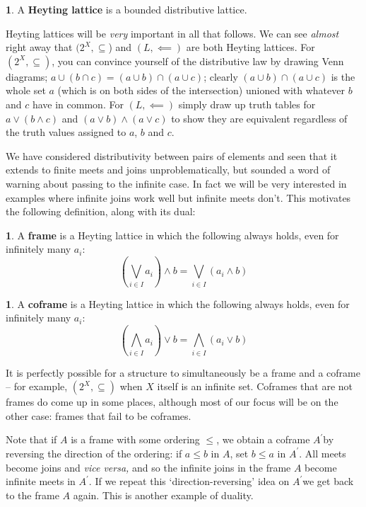 \documentclass[oneside,english]{amsbook}
\numberwithin{section}{chapter}
\theoremstyle{plain}
\theoremstyle{definition}
\newtheorem{defn}[thm]{\protect\definitionname}
\providecommand{\definitionname}{Definition}
\begin{document}
\begin{defn} 
	A \textbf{Heyting lattice} is a bounded distributive lattice. 
\end{defn} 

Heyting lattices will be \emph{very} important in all that follows. We can see \emph{almost }right away that $(2^{X},\subseteq$) and $(L,\impliedby)$ are both Heyting lattices. For $(2^{X},\subseteq)$, you can convince yourself of the distributive law by drawing Venn diagrams; $a\cup(b\cap c)=(a\cup b)\cap(a\cup c)$; clearly $(a\cup b)\cap(a\cup c)$ is the whole set $a$ (which is on both sides of the intersection) unioned with whatever $b$ and $c$ have in common. For $(L,\impliedby)$ simply draw up truth tables for $a\lor(b\land c)$ and $(a\lor b)\land(a\lor c)$ to show they are equivalent regardless of the truth values assigned to $a$, $b$ and $c$.

We have considered distributivity between pairs of elements and seen that it extends to finite meets and joins unproblematically, but sounded a word of warning about passing to the infinite case. In fact we will be very interested in examples where infinite joins work well but infinite meets don't. This motivates the following definition, along with its dual: 

\begin{defn} 
	A \textbf{frame }is a Heyting lattice in which the following always holds, even for infinitely many $a_{i}$:
		\[ (\bigvee_{i\in I}a_{i})\land b=\bigvee_{i\in I}(a_{i}\land b) \]
\end{defn}

\begin{defn} 
	A \textbf{coframe }is a Heyting lattice in which the following always holds, even for infinitely many $a_{i}$: 
		\[ (\bigwedge_{i\in I}a_{i})\lor b=\bigwedge_{i\in I}(a_{i}\lor b) \]
\end{defn} 

It is perfectly possible for a structure to simultaneously be a frame and a coframe -- for example, $(2^{X},\subseteq)$ when $X$ itself is an infinite set. Coframes that are not frames do come up in some places, although most of our focus will be on the other case: frames that fail to be coframes.

Note that if $A$ is a frame with some ordering $\le$, we obtain a coframe $A^{\prime}$by reversing the direction of the ordering: if $a\le b$ in $A$, set $b\le a$ in $A^{\prime}.$ All meets become joins and \emph{vice versa, }and so the infinite joins in the frame $A$ become infinite meets in $A^{\prime}$. If we repeat this `direction-reversing' idea on $A^{\prime}$we get back to the frame $A$ again. This is another example of duality.
\end{document}

